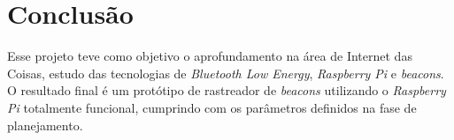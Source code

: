 \documentclass[
		12pt,				%
		openright,			%
		oneside,			%
		a4paper,			%
		chapter=TITLE,		%
		english,			%
		brazil				%
	]{abntex2}
\begin{document}




















\chapter{Conclusão}

Esse projeto teve como objetivo o aprofundamento na área de Internet das Coisas, estudo das tecnologias de \textit{Bluetooth Low Energy}, \textit{Raspberry Pi} e \textit{beacons}. O resultado final é um protótipo de rastreador de \textit{beacons} utilizando o \textit{Raspberry Pi} totalmente funcional, cumprindo com os parâmetros definidos na fase de planejamento.
\end{document}
